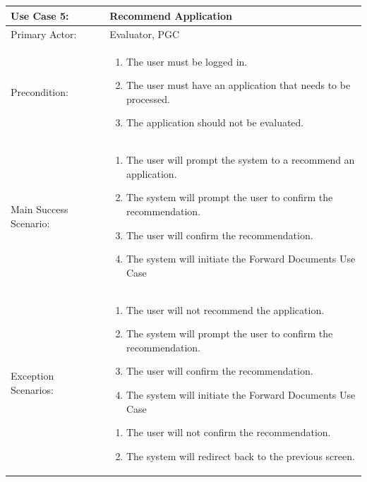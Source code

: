\documentclass{article}
\begin{document}
\\ \\ \\ \\
\begin{tabular} {| m{5cm} | m{10cm} |}
\hline
Use Case 5: & Recommend Application \\
\hline
Primary Actor: & Evaluator, PGC \\
\hline
Precondition: & \begin{enumerate} \itemsep0em \item The user must be logged in. 
\item The user must have an application that needs to be processed.
\item The application should not be evaluated.
\end{enumerate} \\
\hline
Main Success Scenario: & \begin{enumerate} \itemsep0em \item The user will prompt the system to a recommend an application.
\item The system will prompt the user to confirm the recommendation.
\item The user will confirm the recommendation.
\item The system will initiate the Forward Documents Use Case
\end{enumerate}\\
\hline
Exception Scenarios: & \begin{enumerate} \itemsep0em \item The user will not recommend the application.
\item The system will prompt the user to confirm the recommendation.
\item The user will confirm the recommendation.
\item The system will initiate the Forward Documents Use Case
\end{enumerate} \begin{enumerate}  \itemsep0em \item The user will not confirm the recommendation.
\item The system will redirect back to the previous screen.
\end{enumerate} \\
\hline
\end{tabular}
\\ \\ \\ \\
\end{document}
